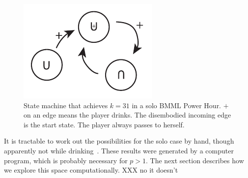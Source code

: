 \documentclass[twocolumn]{article}
\begin{document}
\begin{figure}[ht]
\begin{center}
\includegraphics[width=0.90 \linewidth]{solo31.pdf}
\end{center}\vspace{-0.1in}
\caption{State machine that achieves $k=31$ in a solo BMML Power Hour.
  $+$ on an edge means the player drinks. The disembodied incoming
  edge is the start state. The player always passes to herself.}
\label{fig:solo31}
\end{figure}

It is tractable to work out the possibilities for the solo case by
hand, though apparently not while drinking~\cite{algorithms}. These
results were generated by a computer program, which is probably
necessary for $p>1$. The next section describes how we explore this
space computationally. XXX no it doesn't
\end{document}
